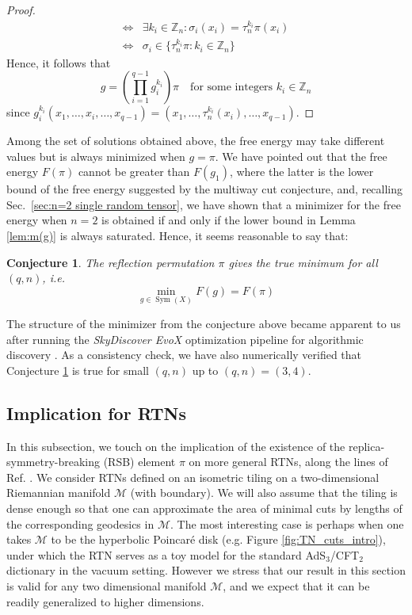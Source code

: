 \documentclass[11pt,oneside,letterpaper]{article}
\numberwithin{equation}{section}
\newtheorem{conjecture}[theorem]{Conjecture}
\theoremstyle{definition}
\theoremstyle{remark}
\DeclareMathOperator{\Sym}{Sym}
\begin{document}
\begin{proof}
\begin{equation}
\begin{split}
      \iff & \exists k_i\in \mathbb{Z}_n: \sigma_i(x_i) = \tau_n^{k_i}\pi(x_i) \\
      \iff & \sigma_i\in\{\tau_n^{k_i}\pi: k_i\in \mathbb{Z}_n\}
    \end{split}
  \end{equation}
  Hence, it follows that
  \begin{equation}
    g=\left(\prod_{i=1}^{q-1}g_i^{k_i}\right)\pi \quad \text{for some integers $k_i\in\mathbb{Z}_n$}
  \end{equation}
  since $g_i^{k_i}(x_1, \dots, x_i, \dots, x_{q-1}) = (x_1, \dots, \tau_n^{k_i}(x_i), \dots, x_{q-1})$.
\end{proof}

Among the set of solutions obtained above, the free energy may take different values but is always minimized when $g=\pi$. We have pointed out that the free energy $F(\pi)$ cannot be greater than $F(g_1)$, where the latter is the lower bound of the free energy suggested by the multiway cut conjecture, and, recalling Sec.~\ref{sec:n=2 single random tensor}, we have shown that a minimizer for the free energy when $n=2$ is obtained if and only if the lower bound in Lemma \ref{lem:m(g)} is always saturated. Hence, it seems reasonable to say that:

\begin{conjecture}\label{conjecture:higher n}
  The reflection permutation $\pi$ gives the true minimum for all $(q, n)$, i.e.
  \begin{equation}
    \min_{g\in \Sym(X)} F(g) = F(\pi)
  \end{equation}
\end{conjecture}

The structure of the minimizer from the conjecture above became apparent to us after running the \emph{SkyDiscover EvoX} optimization pipeline for algorithmic discovery \cite{skydiscover2026}.
As a consistency check, we have also numerically verified that Conjecture \ref{conjecture:higher n} is true for small $(q,n)$ up to $(q,n)=(3, 4)$.


\subsection{Implication for RTNs}
In this subsection, we touch on the implication of the existence of the replica-symmetry-breaking (RSB) element $\pi$ on more general RTNs, along the lines of Ref. \cite{Akella:2026bci}.
We consider RTNs defined on an isometric tiling on a two-dimensional Riemannian manifold $\mathcal{M}$ (with boundary). We will also assume that the tiling is dense enough so that one can approximate the area of minimal cuts by lengths of the corresponding geodesics in $\mathcal{M}$.
The most interesting case is perhaps when one takes $\mathcal{M}$ to be the hyperbolic Poincar\'e disk (e.g. Figure \ref{fig:TN_cuts_intro}), under which the RTN serves as a toy model for the standard AdS$_3$/CFT$_2$ dictionary in the vacuum setting.
However we stress that our result in this section is valid for any two dimensional manifold $\mathcal{M}$, and we expect that it can be readily generalized to higher dimensions.
\end{document}
